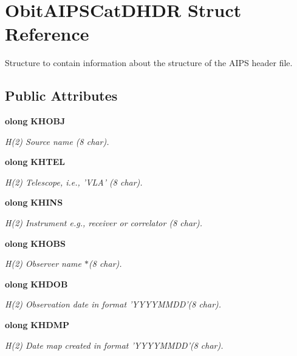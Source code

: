 \section{Obit\-AIPSCat\-DHDR Struct Reference}
\label{structObitAIPSCatDHDR}
Structure to contain information about the structure of the AIPS header file.  


\subsection*{Public Attributes}
\begin{CompactItemize}
\item 
{\bf olong} {\bf KHOBJ}
\begin{CompactList}\small\item\em H(2) Source name (8 char). \item\end{CompactList}\item 
{\bf olong} {\bf KHTEL}
\begin{CompactList}\small\item\em H(2) Telescope, i.e., 'VLA' (8 char). \item\end{CompactList}\item 
{\bf olong} {\bf KHINS}
\begin{CompactList}\small\item\em H(2) Instrument e.g., receiver or correlator (8 char). \item\end{CompactList}\item 
{\bf olong} {\bf KHOBS}
\begin{CompactList}\small\item\em H(2) Observer name $\ast$(8 char). \item\end{CompactList}\item 
{\bf olong} {\bf KHDOB}
\begin{CompactList}\small\item\em H(2) Observation date in format 'YYYYMMDD'(8 char). \item\end{CompactList}\item 
{\bf olong} {\bf KHDMP}
\begin{CompactList}\small\item\em H(2) Date map created in format 'YYYYMMDD'(8 char). \item\end{CompactList}\item 

\end{CompactItemize}
